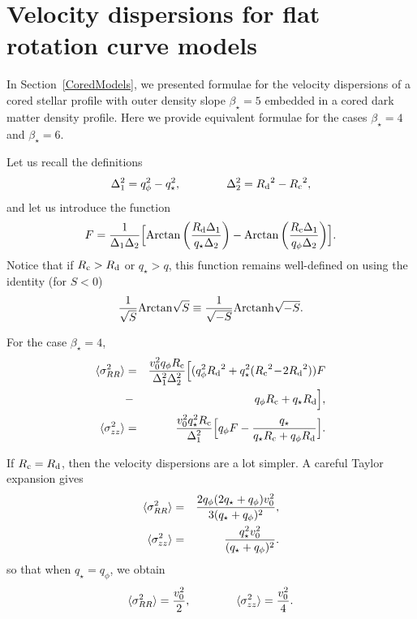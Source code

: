 \documentclass[prd,twocolumn,showpacs,preprintnumbers,superscriptaddress,nofootinbib,amsmath,amssymb,nobalancelastpage]{revtex4}
\def\arctanh{{\rm Arctanh}}
\def\arctan{{\rm Arctan}}
\def\Rd{{R_{\rm d}}}
\def\Rc{{R_{\rm c}}}
\begin{document}
\section{Velocity dispersions for flat rotation curve models}

In Section~\ref{CoredModels}, we presented formulae for the velocity
dispersions of a cored stellar profile with outer density slope
$\beta_\star=5$ embedded in a cored dark matter density profile. Here
we provide equivalent formulae for the cases $\beta_\star=4$ and
$\beta_\star=6$.

Let us recall the definitions
%
\begin{equation}
\Delta_1^2 = q_\phi^2 -q_\star^2,\qquad\qquad \Delta_2^2 = \Rd^2-\Rc^2,
\end{equation}
%
and let us introduce the function
%
\begin{equation}
F ={1\over \Delta_1 \Delta_2}\Bigl[
\arctan \left({\Rd \Delta_1\over q_\star \Delta_2}\right)-
\arctan \left({\Rc \Delta_1 \over q_\phi \Delta_2} \right)\Bigr].
\end{equation}
%
Notice that if $\Rc>\Rd$ or $q_\star>q$, this function remains
well-defined on using the identity (for $S<0$)
%
\[
{1\over \sqrt{S}}\arctan\sqrt{S} \equiv {1\over \sqrt{-S}}\arctanh\sqrt{-S}.
\]

For the case $\beta_\star=4$,
%
\begin{eqnarray}
\langle\sigma^2_{RR}\rangle &=&  {v_0^2 q_\phi\Rc \over
  \Delta_1^2\Delta_2^2} \Bigl[ (q_\phi^2\Rd^2 + q_\star^2(\Rc^2\!-\!2\Rd^2))F
  \\&-& q_\phi\Rc + q_\star\Rd\Bigr],\nonumber\\
\langle\sigma^2_{zz}\rangle &=&
{v_0^2 q_\star^2 \Rc\over \Delta_1^2} \Bigl[ q_\phi F - {q_\star \over
q_\star\Rc + q_\phi \Rd}\Bigr].
\end{eqnarray}
%

If $\Rc =\Rd$, then the velocity dispersions are a lot simpler. A
careful Taylor expansion gives
%
\begin{eqnarray}
\langle\sigma^2_{RR}\rangle &=& {2q_\phi(2q_\star+q_\phi)  v_0^2 \over
  3(q_\star + q_\phi)^2},\nonumber\\
\langle\sigma^2_{zz}\rangle &=& {q_\star^2v_0^2\over (q_\star + q_\phi)^2}.
\end{eqnarray}
%
so that when $q_\star = q_\phi$, we obtain
%
\begin{equation}
\langle\sigma^2_{RR}\rangle = {v_0^2 \over 2},\qquad\qquad
\langle\sigma^2_{zz}\rangle = {v_0^2\over 4}.
\end{equation}
\end{document}
